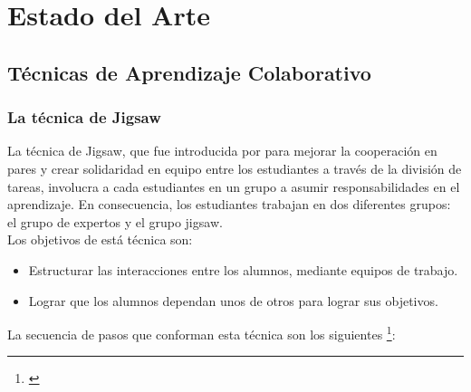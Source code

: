 \chapter{Estado del Arte}
\section{Técnicas de Aprendizaje Colaborativo}

\subsection{La técnica de Jigsaw}

La técnica de Jigsaw, que fue introducida por  para mejorar la cooperación en pares y crear solidaridad en equipo entre los estudiantes a través de la división de tareas, involucra a cada estudiantes en un grupo a asumir responsabilidades en el aprendizaje. En consecuencia, los estudiantes trabajan en dos diferentes grupos: el grupo de expertos y el grupo jigsaw.\\

Los objetivos de está técnica son:

\begin{itemize}
  \item Estructurar las interacciones entre los alumnos, mediante equipos de trabajo.
  \item Lograr que los alumnos dependan unos de otros para lograr sus objetivos.
\end{itemize}

La secuencia de pasos que conforman esta técnica son los siguientes \footnote{\cite{upm_2008}}:

